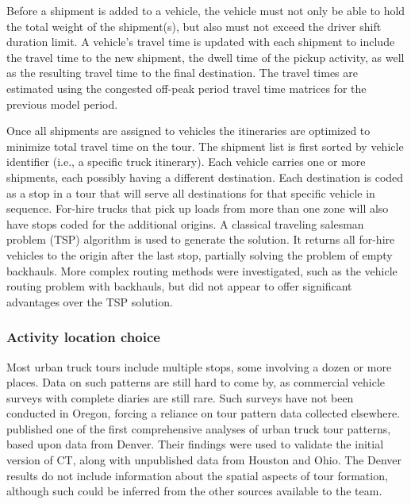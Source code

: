 Before a shipment is added to a vehicle, the vehicle must not only be able to hold the total weight of the shipment(s), but also must not exceed the driver shift duration limit. A vehicle's travel time is updated with each shipment to include the travel time to the new shipment, the dwell time of the pickup activity, as well as the resulting travel time to the final destination. The travel times are estimated using the congested off-peak period travel time matrices for the previous model period.

Once all shipments are assigned to vehicles the itineraries are optimized to minimize total travel time on the tour. The shipment list is first sorted by vehicle identifier (i.e., a specific truck itinerary). Each vehicle carries one or more shipments, each possibly having a different destination. Each destination is coded as a stop in a tour that will serve all destinations for that specific vehicle in sequence. For-hire trucks that pick up loads from more than one zone will also have stops coded for the additional origins. A classical traveling salesman problem (TSP) algorithm is used to generate the solution. It returns all for-hire vehicles to the origin after the last stop, partially solving the problem of empty backhauls. More complex routing methods were investigated, such as the vehicle routing problem with backhauls, but did not appear to offer significant advantages over the TSP solution.

\subsubsection{Activity location choice}\label{sec:ct-activity-location}
Most urban truck tours include multiple stops, some involving a dozen or more places. Data on such patterns are still hard to come by, as commercial vehicle surveys with complete diaries are still rare. Such surveys have not been conducted in Oregon, forcing a reliance on tour pattern data collected elsewhere. \cite{holguinveras05} published one of the first comprehensive analyses of urban truck tour patterns, based upon data from Denver. Their findings were used to validate the initial version of CT, along with unpublished data from Houston and Ohio. The Denver results do not include information about the spatial aspects of tour formation, although such could be inferred from the other sources available to the team. 

